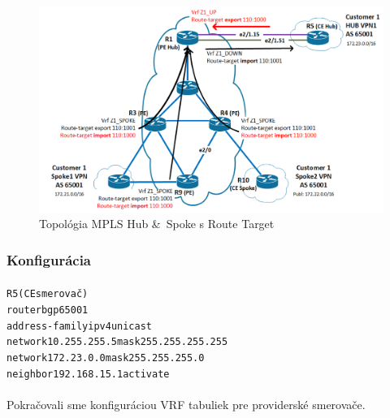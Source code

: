 \documentclass[12pt,twoside,a4paper]{report}
\begin{document}
\begin{figure}[!htbp]
\centering
\includegraphics[width=14cm,keepaspectratio]{mpls_hub_spoke_route_target_topo}
\caption{Topológia MPLS Hub \& Spoke s Route Target}
\label{fig:mpls_hub_spoke_route_target_topo}
\end{figure}

\subsubsection{Konfigurácia}
\paragraph{}

\noindent
{\selectfont
\begin{small}
\begin{alltt}
R5 (CE smerovač)
router bgp 65001
  address-family ipv4 unicast
    network 10.255.255.5 mask 255.255.255.255
    network 172.23.0.0 mask 255.255.255.0
    neighbor 192.168.15.1 activate
\end{alltt}
\end{small}
}

\paragraph{}
Pokračovali sme konfiguráciou VRF tabuliek pre providerské smerovače.
\end{document}
